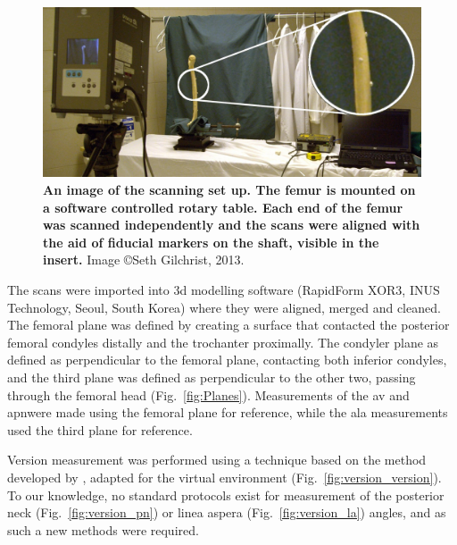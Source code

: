 \begin{figure}
\centering
\includegraphics[width=0.7\linewidth]{./appendixVersion/figures/setup}
\caption[Femur scanning set up]{\textbf{An image of the scanning set up. The femur is mounted on a software controlled rotary table. Each end of the femur was scanned independently and the scans were aligned with the aid of fiducial markers on the shaft, visible in the insert.} Image \copyright Seth Gilchrist, 2013.}
\label{fig:version_setup}
\end{figure}

The scans were imported into \ac{3d} modelling software (RapidForm XOR3, INUS Technology, Seoul, South Korea) where they were aligned, merged and cleaned.
The femoral plane was defined by creating a surface that contacted the posterior femoral condyles distally and the trochanter proximally.
The condyler plane as defined as perpendicular to the femoral plane, contacting both inferior condyles, and the third plane was defined as perpendicular to the other two, passing through the femoral head (Fig.~\ref{fig:Planes}).
Measurements of the \ac{av} and \ac{apn}were made using the femoral plane for reference, while the \ac{ala} measurements used the third plane for reference.

Version measurement was performed using a technique based on the method developed by \citet{kingsley_study_1948}, adapted for the virtual environment (Fig.~\ref{fig:version_version}).
To our knowledge, no standard protocols exist for measurement of the posterior neck (Fig.~\ref{fig:version_pn}) or linea aspera (Fig.~\ref{fig:version_la}) angles, and as such a new methods were required.

